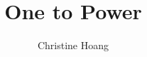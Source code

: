 \documentclass{article}
\title{One to Power}
\author{Christine Hoang}
\begin{document}
\maketitle

\section{}
\end{document}
